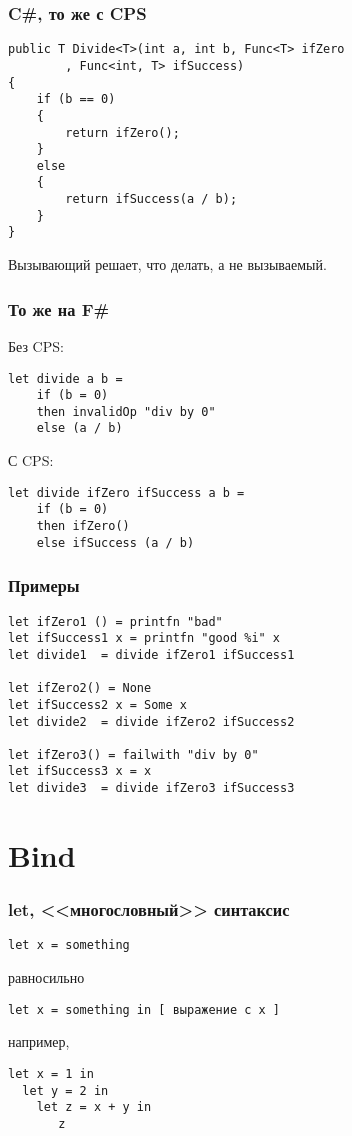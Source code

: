 \documentclass{../../slides-style}
\begin{document}
    \begin{frame}[fragile]
        \frametitle{C\#, то же с CPS}
        \begin{verbatim}
public T Divide<T>(int a, int b, Func<T> ifZero
        , Func<int, T> ifSuccess)
{
    if (b == 0)
    {
        return ifZero();
    }
    else
    {
        return ifSuccess(a / b);
    }
}
        \end{verbatim}
        Вызывающий решает, что делать, а не вызываемый.
    \end{frame}

    \begin{frame}[fragile]
        \frametitle{То же на F\#}
        Без CPS:
        \begin{verbatim}
let divide a b =
    if (b = 0) 
    then invalidOp "div by 0"
    else (a / b)
        \end{verbatim}
        С CPS:
        \begin{verbatim}
let divide ifZero ifSuccess a b = 
    if (b = 0) 
    then ifZero()
    else ifSuccess (a / b)
        \end{verbatim}
    \end{frame}

    \begin{frame}[fragile]
        \frametitle{Примеры}
        \begin{verbatim}
let ifZero1 () = printfn "bad"
let ifSuccess1 x = printfn "good %i" x
let divide1  = divide ifZero1 ifSuccess1

let ifZero2() = None
let ifSuccess2 x = Some x
let divide2  = divide ifZero2 ifSuccess2

let ifZero3() = failwith "div by 0"
let ifSuccess3 x = x
let divide3  = divide ifZero3 ifSuccess3
        \end{verbatim}
    \end{frame}

    \section{Bind}

    \begin{frame}[fragile]
        \frametitle{let, <<многословный>> синтаксис}
        \begin{verbatim}
let x = something
        \end{verbatim}
        равносильно
        \begin{verbatim}
let x = something in [ выражение c x ]
        \end{verbatim}
        например,
        \begin{verbatim}
let x = 1 in
  let y = 2 in
    let z = x + y in
       z
        \end{verbatim}
    \end{frame}
\end{document}
